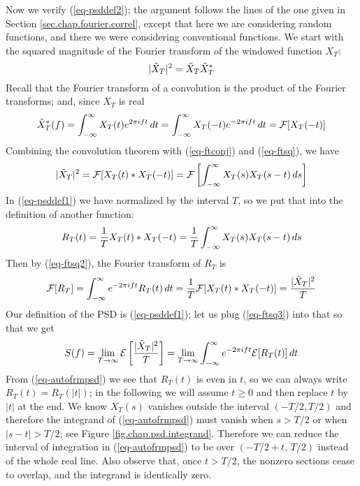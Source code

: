 \documentclass[12pt]{article}\usepackage{graphicx, color}
\begin{document}
Now we verify (\ref{eq-psddef2});
the argument follows the lines of the one
given in Section \ref{sec.chap.fourier.correl},
except that here we are considering random functions,
and there we were considering conventional functions.
We start with the squared magnitude of the Fourier transform
of the windowed function $X_T$:
%
\begin{equation}
\label{eq-ftsq}
| \tilde{X}_T | ^ 2 = \tilde{X}_T \tilde{X}_T ^ *
\end{equation}
%
Recall that the Fourier transform of a convolution is the product of the
Fourier transforms;
and, since $X_T$ is real
%
\begin{equation}
\label{eq-ftconj}
\tilde{X}^*_T (f)
= \int_{- \infty} ^{\infty} X_T (t) e ^ {2 \pi i ft} \, dt 
= \int_{- \infty} ^{\infty} X_T (-t) e ^ {-2 \pi i ft} \, dt 
= \mathcal{F} [ X_T (-t) ]
\end{equation}
%
Combining the convolution theorem with (\ref{eq-ftconj})
and (\ref{eq-ftsq}), we have
%
\begin{equation}
\label{eq-ftsq2}
| \tilde{X}_T | ^ 2 = \mathcal{F} [ X_T (t) \ast X_T (-t) ]
= \mathcal{F} \left [ \int_{- \infty} ^{\infty} X_T (s) X_T (s - t) \, ds \right ]
\end{equation}
%
In (\ref{eq-psddef1}) we have normalized by the interval $T$,
so we put that
into the definition of another function:
%
\begin{equation}
\label{eq-autofrmpsd}
R_T (t) = \frac{1}{T} X_T (t) \ast X_T (-t)
= \frac{1}{T} \int_{- \infty} ^{\infty} X_T (s) X_T (s - t) \, ds 
\end{equation}
%
Then by (\ref{eq-ftsq2}), the Fourier transform of $R_T$ is
%
\begin{equation}
\label{eq-ftsq3}
\mathcal{F} [ R_T ] = \int_{- \infty} ^{\infty} e ^ {-2 \pi i ft} R_T (t) \, dt
= \frac{1}{T}\mathcal{F} [ X_T (t) \ast X_T (-t) ] =
\frac{| \tilde{X}_T | ^ 2}{T}
\end{equation}
%
Our definition of the PSD is (\ref{eq-psddef1});
let us plug (\ref{eq-ftsq3}) into that so that we get
%
\begin{equation}
\label{eq-psdftsq}
S(f) = 
\lim_{T \to \infty} \mathcal{E} \left [
\frac{| \tilde{X}_T | ^ 2}{T} \right ] = 
\lim_{T \to \infty} 
\int_{- \infty} ^{\infty} e ^ {-2 \pi i ft } \mathcal{E} [ R_T (t) ] \, dt
\end{equation}
%
From (\ref{eq-autofrmpsd}) we see that $R_T (t)$ is even in $t$,
so we can always write $R_T (t) = R_T ( | t | )$;
in the following we will assume 
$t \ge 0$ and then replace $t$ by $| t |$ at the end.
We know $X_T (s)$
vanishes outside the interval $(-T/2, T/2)$ and therefore the integrand
of (\ref{eq-autofrmpsd}) must vanish when $ s > T/2$ or when $| s - t | > T/2$;
see Figure \ref{fig.chap.psd.integrand}.
Therefore we can reduce the interval of integration in
(\ref{eq-autofrmpsd}) to be over $(-T/2 + t, \,T/2)$ instead of the whole real line.
Also observe that, once $t > T/2$,
the nonzero sections cease to overlap,
and the integrand is identically zero.
\end{document}
